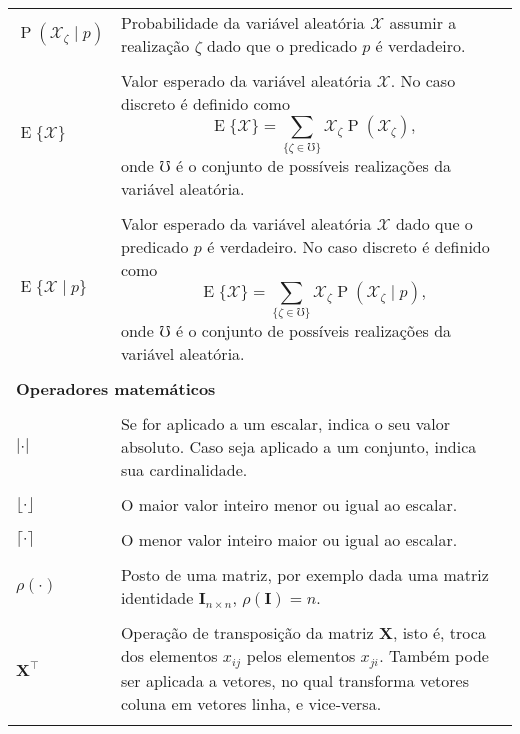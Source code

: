 \begin{longtable}{p{1in}p{4.5in}}
$\operatorname{P}(\mathcal{X}_\zeta\mid p)$ \dotfill &
\index{probabilidade!condicional}%
\index{$\operatorname{P}(\mathcal{X}_\zeta\mid p)$}%
Probabilidade da variável aleatória $\mathcal{X}$ assumir a realização
$\zeta$ dado que o predicado $p$ é verdadeiro.
\tabularnewline
\tabularnewline

$\operatorname{E}\{\mathcal{X}\}$ \dotfill &
\index{valor esperado}%
\index{$\operatorname{E}\{\mathcal{X}\}$}%
Valor esperado da variável aleatória $\mathcal{X}$.
No caso discreto é definido como
\begin{equation*}
\operatorname{E}\{\mathcal{X}\}=
    \sum_{\{\zeta \in \mho\}}
        \mathcal{X}_\zeta \operatorname{P}(\mathcal{X}_\zeta)\text{,}
\end{equation*}
onde $\mho$ é o conjunto de possíveis realizações da variável aleatória.
\tabularnewline
\tabularnewline

$\operatorname{E}\{\mathcal{X}\mid p\}$ \dotfill &
Valor esperado da variável aleatória $\mathcal{X}$ dado que o predicado $p$
é verdadeiro.
No caso discreto é definido como
\begin{equation*}
\operatorname{E}\{\mathcal{X}\}=
    \sum_{\{\zeta \in \mho\}}
        \mathcal{X}_\zeta \operatorname{P}(\mathcal{X}_\zeta\mid p)\text{,}
\end{equation*}
onde $\mho$ é o conjunto de possíveis realizações da variável aleatória.
\tabularnewline
\tabularnewline

\multicolumn{2}{l}{\bf Operadores matemáticos}
\tabularnewline
\tabularnewline

$|\cdot|$ \dotfill &
\index{valor absoluto}%
\index{cardinalidade}%
Se for aplicado a um escalar, indica o seu valor absoluto.
Caso seja aplicado a um conjunto, indica sua cardinalidade.
\tabularnewline
\tabularnewline

$\lfloor\cdot\rfloor$ \dotfill &
O maior valor inteiro menor ou igual ao escalar.
\tabularnewline
\tabularnewline

$\lceil\cdot\rceil$ \dotfill &
O menor valor inteiro maior ou igual ao escalar.
\tabularnewline
\tabularnewline

$\rho(\cdot)$ \dotfill &
\index{$\rho(\cdot)$}%
\index{posto}%
\index{matriz!posto da}%
Posto de uma matriz, por exemplo dada uma matriz identidade
$\mathbf{I}_{n \times n}$, $\rho(\mathbf{I})=n$.
\tabularnewline
\tabularnewline

$\mathbf{X}^\intercal$ \dotfill &
\index{matriz!transposta}%
Operação de transposição da matriz $\mathbf{X}$, isto é, troca dos elementos
$x_{ij}$ pelos elementos $x_{ji}$.
Também pode ser aplicada a vetores, no qual transforma vetores coluna em
vetores linha, e vice-versa.
\tabularnewline
\tabularnewline


\end{longtable}

